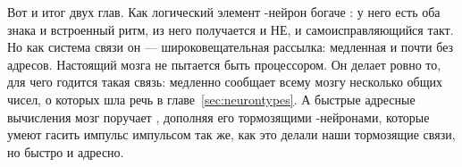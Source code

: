 Вот и итог двух глав. Как логический элемент -нейрон богаче : у него есть оба знака и встроенный ритм, из него получается и НЕ, и самоисправляющийся такт. Но как система связи он --- широковещательная рассылка: медленная и почти без адресов. Настоящий  мозга не пытается быть процессором. Он делает ровно то, для чего годится такая связь: медленно сообщает всему мозгу несколько общих чисел, о которых шла речь в главе~\ref{sec:neurontypes}. А быстрые адресные вычисления мозг поручает , дополняя его тормозящими -нейронами, которые умеют гасить импульс импульсом так же, как это делали наши тормозящие связи, но быстро и адресно.
